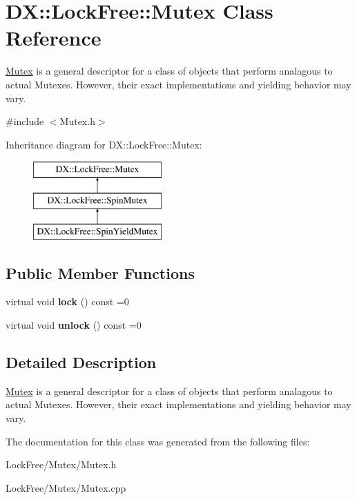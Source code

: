 \hypertarget{class_d_x_1_1_lock_free_1_1_mutex}{\section{D\-X\-:\-:Lock\-Free\-:\-:Mutex Class Reference}
\label{class_d_x_1_1_lock_free_1_1_mutex}
}


\hyperlink{class_d_x_1_1_lock_free_1_1_mutex}{Mutex} is a general descriptor for a class of objects that perform analagous to actual Mutexes. However, their exact implementations and yielding behavior may vary.  




{\ttfamily \#include $<$Mutex.\-h$>$}

Inheritance diagram for D\-X\-:\-:Lock\-Free\-:\-:Mutex\-:\begin{figure}[H]
\begin{center}
\leavevmode
\includegraphics[height=3.000000cm]{class_d_x_1_1_lock_free_1_1_mutex}
\end{center}
\end{figure}
\subsection*{Public Member Functions}
\begin{DoxyCompactItemize}
\item 
\hypertarget{class_d_x_1_1_lock_free_1_1_mutex_acf5c8caa6a556b29df4ed345f6cd0858}{virtual void {\bfseries lock} () const =0}\label{class_d_x_1_1_lock_free_1_1_mutex_acf5c8caa6a556b29df4ed345f6cd0858}

\item 
\hypertarget{class_d_x_1_1_lock_free_1_1_mutex_a4975ec604dfd57bf96cd1f374ce3f2a3}{virtual void {\bfseries unlock} () const =0}\label{class_d_x_1_1_lock_free_1_1_mutex_a4975ec604dfd57bf96cd1f374ce3f2a3}

\end{DoxyCompactItemize}


\subsection{Detailed Description}
\hyperlink{class_d_x_1_1_lock_free_1_1_mutex}{Mutex} is a general descriptor for a class of objects that perform analagous to actual Mutexes. However, their exact implementations and yielding behavior may vary. 

The documentation for this class was generated from the following files\-:\begin{DoxyCompactItemize}
\item 
Lock\-Free/\-Mutex/Mutex.\-h\item 
Lock\-Free/\-Mutex/Mutex.\-cpp\end{DoxyCompactItemize}
